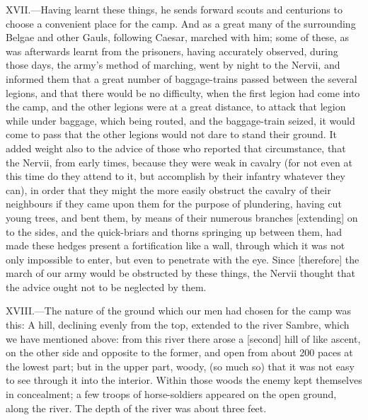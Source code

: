 XVII.—Having learnt these things, he sends forward scouts and
centurions to choose a convenient place for the camp. And as a great
many of the surrounding Belgae and other Gauls, following Caesar,
marched with him; some of these, as was afterwards learnt from the
prisoners, having accurately observed, during those days, the army's
method of marching, went by night to the Nervii, and informed them that
a great number of baggage-trains passed between the several legions, and
that there would be no difficulty, when the first legion had come into
the camp, and the other legions were at a great distance, to attack that
legion while under baggage, which being routed, and the baggage-train
seized, it would come to pass that the other legions would not dare to
stand their ground. It added weight also to the advice of those who
reported that circumstance, that the Nervii, from early times, because
they were weak in cavalry (for not even at this time do they attend to
it, but accomplish by their infantry whatever they can), in order that
they might the more easily obstruct the cavalry of their neighbours if
they came upon them for the purpose of plundering, having cut young
trees, and bent them, by means of their numerous branches [extending] on
to the sides, and the quick-briars and thorns springing up between them,
had made these hedges present a fortification like a wall, through which
it was not only impossible to enter, but even to penetrate with the eye.
Since [therefore] the march of our army would be obstructed by these
things, the Nervii thought that the advice ought not to be neglected by
them.

XVIII.—The nature of the ground which our men had chosen for the camp
was this: A hill, declining evenly from the top, extended to the river
Sambre, which we have mentioned above: from this river there arose a
[second] hill of like ascent, on the other side and opposite to the
former, and open from about 200 paces at the lowest part; but in the
upper part, woody, (so much so) that it was not easy to see through it
into the interior. Within those woods the enemy kept themselves in
concealment; a few troops of horse-soldiers appeared on the open ground,
along the river. The depth of the river was about three feet.

